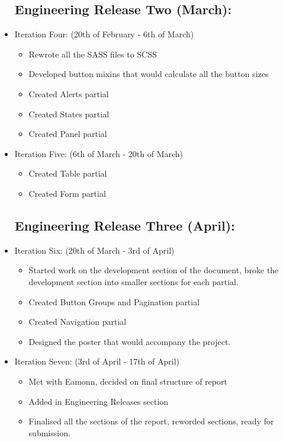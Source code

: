 \begin{itemize}
	\subsection*{Engineering Release Two (March):}
	\item Iteration Four: (20th of February - 6th of March)\begin{itemize} 
	\item Rewrote all the \gls{SASS} files to \gls{SCSS}
	\item Developed button \gls{mixins} that would calculate all the button sizes
	\item Created Alerts partial
	\item Created States partial
	\item Created Panel partial
	\end{itemize}
	\item Iteration Five: (6th of March - 20th of March) \begin{itemize}
	\item Created Table partial
	\item Created Form partial
	\end{itemize}
	\subsection*{Engineering Release Three (April):}
	\item Iteration Six: (20th of March - 3rd of April)\begin{itemize}
	\item Started work on the development section of the document, broke the development section into smaller sections for each partial. 
	\item Created Button Groups and Pagination partial
	\item Created Navigation partial
	\item Designed the poster that would accompany the project.
	\end{itemize}
		\item Iteration Seven: (3rd of April - 17th of April)\begin{itemize}
	\item Met with Eamonn, decided on final structure of report
	\item Added in Engineering Releases section
	\item Finalised all the sections of the report, reworded sections, ready for submission.
	\end{itemize}	
\end{itemize}
